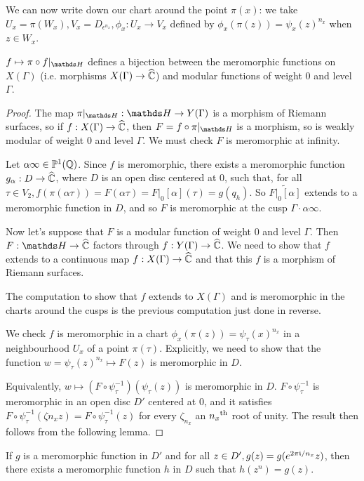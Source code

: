 \documentclass[10pt,a4paper]{article}
\begin{document}
We can now write down our chart around the point $\pi(x)$: we take $U_x = \pi(W_x), V_x =D_{\epsilon^{n_x}}, \phi_x:U_x \to V_x$ defined by $\phi_x(\pi(z)) = \psi_x(z)^{n_x}$ when $z \in W_x$.
\begin{proposition}
  $f \mapsto \pi \circ f|_{\H}$ defines a bijection between the meromorphic functions on $X(\Gamma)$ (i.e. morphisms $X(\Gamma) \to \widehat{\mathbb{C}}$) and modular functions of weight 0 and level $\Gamma$.
\end{proposition}
\begin{proof}
  The map $\pi|_{\H}: \H \to Y(\Gamma)$ is a morphism of Riemann surfaces, so if $f: X(\Gamma) \to \widehat{\mathbb{C}}$, then $F = f \circ \pi|_{\H}$ is a morphism, so is weakly modular of weight 0 and level $\Gamma$. We must check $F$ is meromorphic at infinity.

  Let $\alpha \infty \in \mathbb{P}^1(\mathbb{Q})$. Since $f$ is meromorphic, there exists a meromorphic function $g_\alpha: D \to \widehat{\mathbb{C}}$, where $D$ is an open disc centered at 0, such that, for all $\tau \in V_2, f(\pi(\alpha\tau)) = F(\alpha \tau) = F|_0[\alpha](\tau) = g(q_h)$. So $\tilde{F|_0[\alpha]}$ extends to a meromorphic function in $D$, and so $F$ is meromorphic at the cusp $\Gamma \cdot \alpha \infty$.

  Now let's suppose that $F$ is a modular function of weight 0 and level $\Gamma$. Then $F: \H \to \hat{\C}$ factors through $f: Y(\Gamma)\to \widehat{\mathbb{C}}$. We need to show that $f$ extends to a continuous map $f: X(\Gamma)\to \widehat{\mathbb{C}}$ and that this $f$ is a morphism of Riemann surfaces.

  The computation to show that $f$ extends to $X(\Gamma)$ and is meromorphic in the charts around the cusps is the previous computation just done in reverse.

  We check $f$ is meromorphic in a chart $\phi_x(\pi(z)) = \psi_\tau(x)^{n_x}$ in a neighbourhood $U_x$ of a point $\pi(\tau)$. Explicitly, we need to show that the function $w = \psi_\tau(z)^{n_x} \mapsto F(z)$ is meromorphic in $D$.

  Equivalently, $w\mapsto (F \circ \psi_\tau^{-1})(\psi_\tau(z))$ is meromorphic in $D$. $F \circ \psi_\tau^{-1}$ is meromorphic in an open disc $D'$ centered at 0, and it satisfies $F \circ \psi_\tau^{-1}(\zeta{n_x} z) = F \circ \psi_\tau^{-1}(z)$ for every $\zeta_{n_x}$ an $n_x\textsuperscript{th}$ root of unity.  The result then follows from the following lemma.
\end{proof}
\begin{lemma}
  If $g$ is a meromorphic function in $D'$ and for all $z \in D', g(z) = g(e^{2\pi\mathfrak{i}/n_x}z)$, then there exists a meromorphic function $h$ in $D$ such that $h(z^n) = g(z)$.
\end{lemma}
\end{document}
